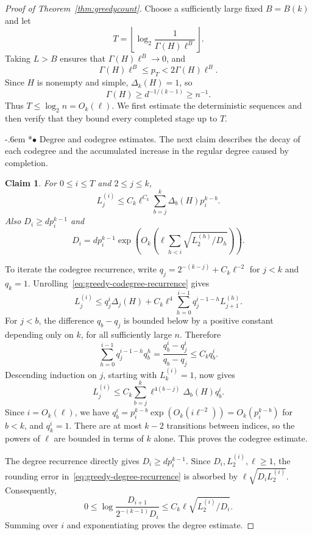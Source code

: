 \documentclass[11pt,reqno]{amsart}
\makeatletter
\numberwithin{equation}{section}
\renewcommand{\paragraph}{\@startsection{paragraph}{4}%
    \z@{.75\linespacing\@plus.2\linespacing\@minus.1\linespacing}%
    {-.6em}%
    {\normalfont\bfseries}}
\newcommand{\proofparagraph}[1]{%
    \paragraph*{$\bullet$ #1}\ignorespaces}
\theoremstyle{plain}
\newtheorem{claim}{Claim}[section]
\newenvironment{claimproof}[1][Proof]{\par
    \pushQED{\qed}%
    \renewcommand{\qedsymbol}{$\blacksquare$}
    \normalfont \topsep6\p@\@plus6\p@\relax
    \trivlist
    \item[\hskip\labelsep
    \textit{#1}\@addpunct{.}~]\ignorespaces
}{%
    \popQED\endtrivlist\@endpefalse
}
\theoremstyle{definition}
\makeatother
\begin{document}
\begin{proof}[Proof of Theorem~\ref{thm:greedycount}]
    Choose a sufficiently large fixed $B=B(k)$ and let
    \[
        T=\left\lfloor\log_2\frac1{\Gamma(H)\ell^B}\right\rfloor.
    \]
    Taking $L>B$ ensures that $\Gamma(H)\ell^B\to0$, and
    \begin{equation}\label{eq:greedy-stopping-scale}
        \Gamma(H)\ell^B\le p_T<2\Gamma(H)\ell^B.
    \end{equation}
    Since $H$ is nonempty and simple, $\Delta_k(H)=1$, so
    \[
        \Gamma(H)\ge d^{-1/(k-1)}\ge n^{-1}.
    \]
    Thus $T\le\log_2 n=O_k(\ell)$.
    We first estimate the deterministic sequences and then verify that they bound every completed stage up to $T$.

    \proofparagraph{Degree and codegree estimates.}
    The next claim describes the decay of each codegree and the accumulated increase in the regular degree caused by completion.

    \begin{claim}\label{clm:greedy-sequences}
        For $0\le i\le T$ and $2\le j\le k$,
        \[
            L_j^{(i)}\le C_k\ell^{C_k}\sum_{b=j}^k\Delta_b(H)p_i^{k-b}.
        \]
        Also $D_i\ge dp_i^{k-1}$ and
        \[
            D_i=dp_i^{k-1}\exp\left(O_k\left(\ell\sum_{h<i}\sqrt{L_2^{(h)}/D_h}\right)\right).
        \]
    \end{claim}
    \begin{claimproof}[Proof of Claim~\ref{clm:greedy-sequences}]
        To iterate the codegree recurrence, write $q_j=2^{-(k-j)}+C_k\ell^{-2}$ for $j<k$ and $q_k=1$.
        Unrolling~\eqref{eq:greedy-codegree-recurrence} gives
        \[
            L_j^{(i)}\le q_j^i\Delta_j(H)
            +C_k\ell^4\sum_{h=0}^{i-1}q_j^{i-1-h}L_{j+1}^{(h)}.
        \]
        For $j<b$, the difference $q_b-q_j$ is bounded below by a positive constant depending only on $k$, for all sufficiently large $n$.
        Therefore
        \[
            \sum_{h=0}^{i-1}q_j^{i-1-h}q_b^h
            =\frac{q_b^i-q_j^i}{q_b-q_j}\le C_kq_b^i.
        \]
        Descending induction on $j$, starting with $L_k^{(i)}=1$, now gives
        \[
            L_j^{(i)}\le C_k\sum_{b=j}^k\ell^{4(b-j)}\Delta_b(H)q_b^i.
        \]
        Since $i=O_k(\ell)$, we have $q_b^i=p_i^{k-b}\exp(O_k(i\ell^{-2}))=O_k(p_i^{k-b})$ for $b<k$, and $q_k^i=1$.
        There are at most $k-2$ transitions between indices, so the powers of $\ell$ are bounded in terms of $k$ alone.
        This proves the codegree estimate.

        The degree recurrence directly gives $D_i\ge dp_i^{k-1}$.
        Since $D_i,L_2^{(i)},\ell\ge1$, the rounding error in~\eqref{eq:greedy-degree-recurrence} is absorbed by $\ell\sqrt{D_iL_2^{(i)}}$.
        Consequently,
        \[
            0\le\log\frac{D_{i+1}}{2^{-(k-1)}D_i}
            \le C_k\ell\sqrt{L_2^{(i)}/D_i}.
        \]
        Summing over $i$ and exponentiating proves the degree estimate.
    \end{claimproof}


\end{proof}
\end{document}
